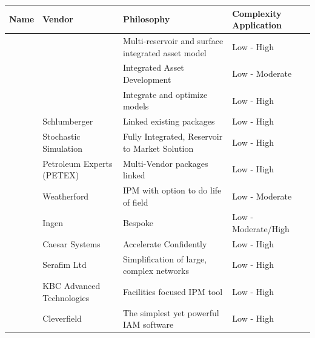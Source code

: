 \documentclass{article}
\begin{document}
\begin{tabular}{llll}
\toprule
Name & Vendor & Philosophy & Complexity Application \\
\midrule
 &  & Multi-reservoir and surface integrated asset model & Low - High \\
 &  & Integrated Asset Development & Low - Moderate \\
 &  & Integrate and optimize models & Low - High \\
 & Schlumberger & Linked existing packages & Low - High \\
 & Stochastic Simulation & Fully Integrated, Reservoir to Market Solution & Low - High \\
 & Petroleum Experts (PETEX) & Multi-Vendor packages linked & Low - High \\
 & Weatherford & IPM with option to do life of field & Low - Moderate \\
 & Ingen & Bespoke & Low - Moderate/High \\
 & Caesar Systems & Accelerate Confidently & Low - High \\
 & Serafim Ltd & Simplification of large, complex networks & Low - High \\
 & KBC Advanced Technologies & Facilities focused IPM tool & Low - High \\
 & Cleverfield & The simplest yet powerful IAM software & Low - High \\
\bottomrule
\end{tabular}
\end{document}
